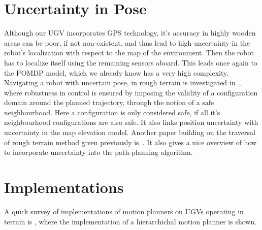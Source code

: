 \section{Uncertainty in Pose}
Although our UGV incorporates GPS technology, it's accuracy in highly wooden
areas can be poor, if not non-existent, and thus lead to high uncertainty in the
robot's localization with respect to the map of the environment. Then the robot
has to localize itself using the remaining sensors aboard. This leads once again
to the POMDP model, which we already know has a very high complexity. Navigating
a robot with uncertain pose, in rough terrain is investigated
in~\cite{haitMotionPlanningRough1996}, where robustness in control is ensured by
imposing the validity of a configuration domain around the planned trajectory,
through the notion of a safe neighbourhood. Here a configuration is only
considered safe, if all it's neighbourhood configurations are also safe. It also
links position uncertainty with uncertainty in the map elevation model. Another
paper building on the traversal of rough terrain method given previously
is~\cite{iagnemmaRapidPhysicsbasedRoughterrain1999}. It also gives a nice
overview of how to incorporate uncertainty into the path-planning algorithm.


\section{Implementations}
A quick survey of implementations of motion planners on UGVs operating in
terrain is \cite{kellyReliableRoadAutonomous2006}, where the implementation of a
hierarchichal motion planner is shown.